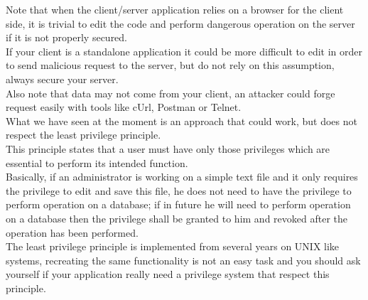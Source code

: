 Note that when the client/server application relies on a browser for the client side, it is trivial to edit the code and perform dangerous operation on the server if it is not properly secured.\\
If your client is a standalone application it could be more difficult to edit in order to send malicious request to the server, but do not rely on this assumption, always secure your server.\\
Also note that data may not come from your client, an attacker could forge request easily with tools like cUrl, Postman or Telnet.\\
What we have seen at the moment is an approach that could work, but does not respect the least privilege principle.\\
This principle states that a user must have only those privileges which are essential to perform its intended function.\\
Basically, if an administrator is working on a simple text file and it only requires the privilege to edit and save this file, he does not need to have the privilege to perform operation on a database; if in future he will need to perform operation on a database then the privilege shall be granted to him and revoked after the operation has been performed.\\
The least privilege principle is implemented from several years on UNIX like systems, recreating the same functionality is not an easy task and you should ask yourself if your application really need a privilege system that respect this principle.

